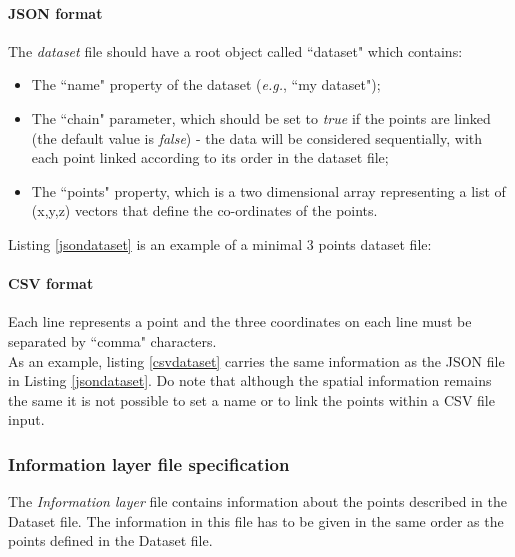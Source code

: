 		\paragraph{JSON format}
The {\it{dataset}} file should have a root object called ``dataset" which contains: \begin{itemize}
\item{The ``name" property of the dataset (\textit{e.g.}, ``my dataset");}
\item{The ``chain" parameter, which should be set to \textit{true} if the points are linked (the default value is \textit{false}) - the data will be considered sequentially, with each point linked according to its order in the dataset file;}
\item{The ``points" property, which is a two dimensional array representing a list of (x,y,z) vectors that define the co-ordinates of the points.}
\end{itemize}

Listing \ref{jsondataset} is an example of a minimal 3 points dataset file:

		\paragraph{CSV format}
Each line represents a point and the three coordinates on each line must be separated by ``comma" characters.\\As an example, listing \ref{csvdataset} carries the same information as the JSON file in Listing \ref{jsondataset}. Do note that although the spatial information remains the same it is not possible to set a name or to link the points within a CSV file input.



		\subsubsection{Information layer file specification}The {\it{Information layer}} file contains information about the points described in the Dataset file. The information in this file has to be given in the same order as the points defined in the Dataset file.

